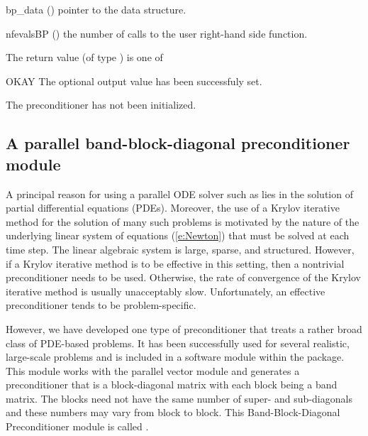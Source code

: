 {
  \begin{args}[nfevalsBP]
  \item[bp\_data] ()
    pointer to the {\cvbandpre} data structure.
  \item[nfevalsBP] ()
    the number of calls to the user right-hand side function.
  \end{args}
}
{
  The return value  (of type ) is one of
  \begin{args}[BP\_NO\_DATA]
  \item[OKAY] 
    The optional output value has been successfuly set.
  \item[\Id{BP\_NO\_DATA}]
    The {\cvbandpre} preconditioner has not been initialized.
  \end{args}
}
{}

\subsection{A parallel band-block-diagonal preconditioner module}\label{sss:cvbbdpre}

A principal reason for using a parallel ODE solver such as {\cvode} lies
in the solution of partial differential equations (PDEs).  Moreover,
the use of a Krylov iterative method for the solution of many such
problems is motivated by the nature of the underlying linear system of
equations (\ref{e:Newton}) that must be solved at each time step.  The
linear algebraic system is large, sparse, and structured. However, if
a Krylov iterative method is to be effective in this setting, then a
nontrivial preconditioner needs to be used.  Otherwise, the rate of
convergence of the Krylov iterative method is usually unacceptably
slow.  Unfortunately, an effective preconditioner tends to be
problem-specific.

However, we have developed one type of preconditioner that treats a
rather broad class of PDE-based problems.  It has been successfully
used for several realistic, large-scale problems \cite{HiTa:98} and is
included in a software module within the {\cvode} package. This module
works with the parallel vector module {\nvecp} and 
generates a preconditioner that is a block-diagonal matrix with each
block being a band matrix. The blocks need not have the same number of
super- and sub-diagonals and these numbers may vary from block to
block. This Band-Block-Diagonal Preconditioner module is called
{\cvbbdpre}.

